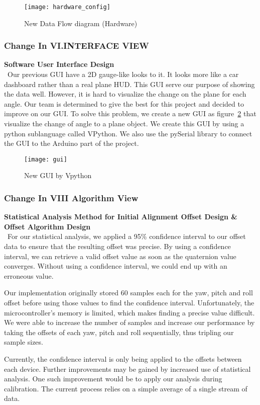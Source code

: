 			\begin{figure}
		 		\caption{New Data Flow diagram (Hardware)}
		      	\texttt{[image: hardware\_config]}
			    \label{fig:hardware_config}
			\end{figure}

		\subsubsection{Change In VI.INTERFACE VIEW}
			\textbf{Software User Interface Design}
			\\ \indent Our previous GUI have a 2D gauge-like looks to it. It looks more like a car dashboard rather than a real plane HUD. This GUI serve our purpose of showing the data well. However, it is hard to visualize the change on the plane for each angle. Our team is determined to give the best for this project and decided to improve on our GUI. To solve this problem, we create a new GUI as figure~\ref{fig:gui}  that visualize the change of angle to a plane object. We create this GUI by using a python sublanguage called VPython. We also use the pySerial library to connect the GUI to the Arduino part of the project.\\

			\begin{figure}
		 		\caption{New GUI by Vpython}
		      	\texttt{[image: gui]}
			    \label{fig:gui}
			\end{figure}

		\subsubsection{Change In VIII Algorithm View}
			\textbf{Statistical Analysis Method for Initial Alignment Offset Design \& Offset Algorithm Design}
			\\ \indent For our statistical analysis, we applied a 95\% confidence interval to our offset data to ensure that the resulting offset was precise. By using a confidence interval, we can retrieve a valid offset value as soon as the quaternion value converges. Without using a confidence interval, we could end up with an erroneous value.

			Our implementation originally stored 60 samples each for the yaw, pitch and roll offset before using those values to find the confidence interval. Unfortunately, the microcontroller's memory is limited, which makes finding a precise value difficult. We were able to increase the number of samples and increase our performance by taking the offsets of each yaw, pitch and roll sequentially, thus tripling our sample sizes.

			Currently, the confidence interval is only being applied to the offsets between each device. Further improvements may be gained by increased use of statistical analysis. One such improvement would be to apply our analysis during calibration. The current process relies on a simple average of a single stream of data.











